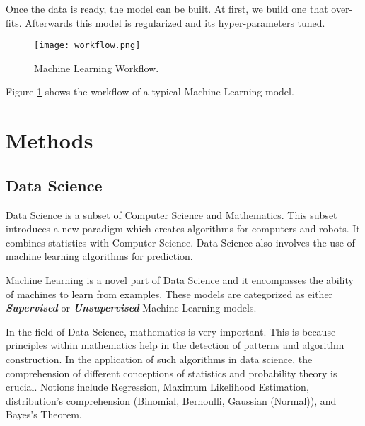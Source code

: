 \documentclass[
]{thesis-ekf}
\begin{document}
Once the data is ready, the model can be built. At first, we build one that over-fits. Afterwards this model is regularized and its hyper-parameters tuned. 

\begin{figure}[h!]
	\texttt{[image: workflow.png]}
	\caption{Machine Learning Workflow.}
	\label{fig:workflow}
\end{figure}

Figure \ref{fig:workflow} shows the workflow of a typical Machine Learning model.



\chapter{Methods}
\section{Data Science}
Data Science is a subset of Computer Science and Mathematics. This subset introduces a new paradigm which creates algorithms for computers and robots. It combines statistics with Computer Science. Data Science also involves the use of machine learning algorithms for prediction.

Machine Learning is a novel part of Data Science and it encompasses the ability of machines to learn from examples. These models are categorized as either \textbf{\textit{Supervised}} or \textbf{\textit{Unsupervised}} Machine Learning models. 

In the field of Data Science, mathematics is very important. This is because principles within mathematics help in the detection of patterns and algorithm construction. In the application of such algorithms in data science, the comprehension of different conceptions of statistics and probability theory is crucial. Notions include Regression, Maximum Likelihood Estimation, distribution's comprehension (Binomial, Bernoulli, Gaussian (Normal)), and Bayes's Theorem.
\end{document}

